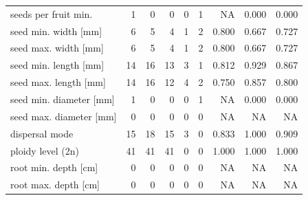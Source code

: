 \begin{longtable}{p{}rrrrrrrr}
seeds per fruit min. & 1 & 0 & 0 & 0 & 1 & NA & 0.000 & 0.000 \\
seed min. width [mm] & 6 & 5 & 4 & 1 & 2 & 0.800 & 0.667 & 0.727 \\
seed max. width [mm] & 6 & 5 & 4 & 1 & 2 & 0.800 & 0.667 & 0.727 \\
seed min. length [mm] & 14 & 16 & 13 & 3 & 1 & 0.812 & 0.929 & 0.867 \\
seed max. length [mm] & 14 & 16 & 12 & 4 & 2 & 0.750 & 0.857 & 0.800 \\
seed min. diameter [mm] & 1 & 0 & 0 & 0 & 1 & NA & 0.000 & 0.000 \\
seed max. diameter [mm] & 0 & 0 & 0 & 0 & 0 & NA & NA & NA \\
dispersal mode & 15 & 18 & 15 & 3 & 0 & 0.833 & 1.000 & 0.909 \\
ploidy level (2n) & 41 & 41 & 41 & 0 & 0 & 1.000 & 1.000 & 1.000 \\
root min. depth [cm] & 0 & 0 & 0 & 0 & 0 & NA & NA & NA \\
root max. depth [cm] & 0 & 0 & 0 & 0 & 0 & NA & NA & NA \\
\end{longtable}
\endgroup
